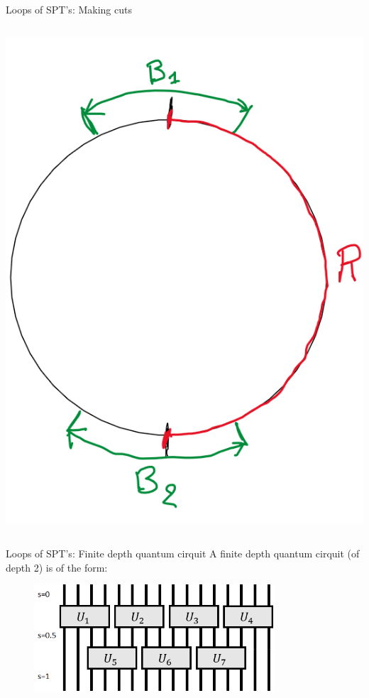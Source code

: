 \documentclass{beamer}
\begin{document}
\begin{frame}{Loops of SPT's: Making cuts}
\begin{columns}
{\begin{column}{0.4\textwidth}
\includegraphics[width=\textwidth]{CircleRegions.png}
\end{column}
}
\end{columns}
\end{frame}

\begin{frame}{Loops of SPT's: Finite depth quantum cirquit}
A finite depth quantum cirquit (of depth 2) is of the form:
\begin{figure}
\center
\includegraphics[width=0.8\textwidth]{FiniteDepthQuantumCirquit.png}
\end{figure}
\end{frame}
\end{document}
